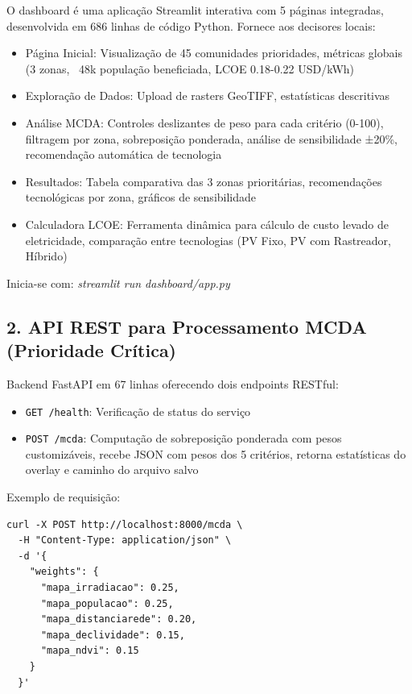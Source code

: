 \documentclass[12pt, a4paper]{article}
\begin{document}
O dashboard é uma aplicação Streamlit interativa com 5 páginas integradas, desenvolvida em 686 linhas de código Python. Fornece aos decisores locais:

\begin{itemize}
    \item Página Inicial: Visualização de 45 comunidades prioridades, métricas globais (3 zonas, ~48k população beneficiada, LCOE 0.18-0.22 USD/kWh)
    \item Exploração de Dados: Upload de rasters GeoTIFF, estatísticas descritivas
    \item Análise MCDA: Controles deslizantes de peso para cada critério (0-100), filtragem por zona, sobreposição ponderada, análise de sensibilidade ±20\%, recomendação automática de tecnologia
    \item Resultados: Tabela comparativa das 3 zonas prioritárias, recomendações tecnológicas por zona, gráficos de sensibilidade
    \item Calculadora LCOE: Ferramenta dinâmica para cálculo de custo levado de eletricidade, comparação entre tecnologias (PV Fixo, PV com Rastreador, Híbrido)
\end{itemize}

Inicia-se com: \textit{streamlit run dashboard/app.py}

\subsection{2. API REST para Processamento MCDA (Prioridade Crítica)}

Backend FastAPI em 67 linhas oferecendo dois endpoints RESTful:

\begin{itemize}
    \item \texttt{GET /health}: Verificação de status do serviço
    \item \texttt{POST /mcda}: Computação de sobreposição ponderada com pesos customizáveis, recebe JSON com pesos dos 5 critérios, retorna estatísticas do overlay e caminho do arquivo salvo
\end{itemize}

Exemplo de requisição:
\begin{verbatim}
curl -X POST http://localhost:8000/mcda \
  -H "Content-Type: application/json" \
  -d '{
    "weights": {
      "mapa_irradiacao": 0.25,
      "mapa_populacao": 0.25,
      "mapa_distanciarede": 0.20,
      "mapa_declividade": 0.15,
      "mapa_ndvi": 0.15
    }
  }'
\end{verbatim}
\end{document}
